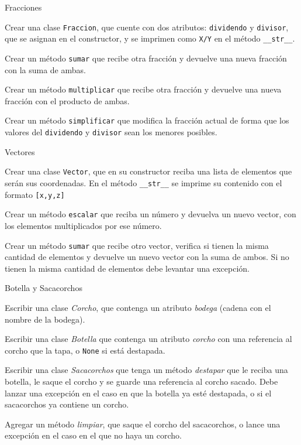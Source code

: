 \begin{ejercicio}
Fracciones
\begin{partes}
    \item Crear una clase \verb!Fraccion!, que cuente con dos atributos:
\verb!dividendo! y \verb!divisor!, que se asignan en el constructor, y se
imprimen como \verb!X/Y! en el método \verb!__str__!.
    \item Crear un método \verb!sumar! que recibe otra fracción y devuelve una
nueva fracción con la suma de ambas.
    \item Crear un método \verb!multiplicar! que recibe otra fracción y
devuelve una nueva fracción con el producto de ambas.
    \item Crear un método \verb!simplificar! que modifica la fracción actual de
forma que los valores del \verb!dividendo! y \verb!divisor! sean los
menores posibles.
\end{partes}
\end{ejercicio}


\begin{ejercicio}
Vectores
\begin{partes}
    \item Crear una clase \verb!Vector!, que en su constructor reciba una lista
de elementos que serán sus coordenadas.  En el método \verb!__str__! se
imprime su contenido con el formato \verb![x,y,z]!
    \item Crear un método \verb!escalar! que reciba un número y devuelva un
nuevo vector, con los elementos multiplicados por ese número.
    \item Crear un método \verb!sumar! que recibe otro vector, verifica si
tienen la misma cantidad de elementos y devuelve un nuevo vector con la
suma de ambos.  Si no tienen la misma cantidad de elementos debe levantar
una excepción.
\end{partes}
\end{ejercicio}


\begin{ejercicio}
Botella y Sacacorchos
\begin{partes}
    \item Escribir una clase \emph{Corcho}, que contenga un atributo
\emph{bodega} (cadena con el nombre de la bodega).
    \item Escribir una clase \emph{Botella} que contenga un atributo
\emph{corcho} con una referencia al corcho que la tapa, o \verb!None! si está
destapada.
    \item Escribir una clase \emph{Sacacorchos} que tenga un método
\emph{destapar} que le reciba una botella, le saque el corcho y se guarde una
referencia al corcho sacado.  Debe lanzar una excepción en el caso en que
la botella ya esté destapada, o si el sacacorchos ya contiene un corcho.
    \item Agregar un método \emph{limpiar}, que saque el corcho del sacacorchos,
o lance una excepción en el caso en el que no haya un corcho.
\end{partes}
\end{ejercicio}


